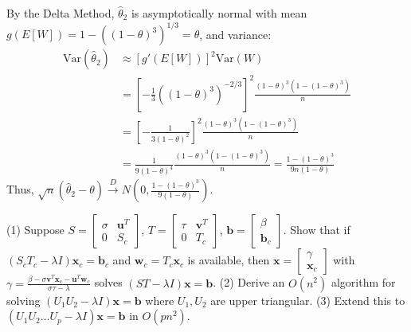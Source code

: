 \begin{solution}
By the Delta Method, $\hat{\theta}_2$ is asymptotically normal with mean $g(E[W]) = 1 - ((1-\theta)^3)^{1/3} = \theta$, and variance:
\begin{align*}
\text{Var}(\hat{\theta}_2) &\approx [g'(E[W])]^2 \text{Var}(W) \\
&= \left[ -\frac{1}{3} ((1-\theta)^3)^{-2/3} \right]^2 \frac{(1-\theta)^3(1-(1-\theta)^3)}{n} \\
&= \left[ -\frac{1}{3(1-\theta)^2} \right]^2 \frac{(1-\theta)^3(1-(1-\theta)^3)}{n} \\
&= \frac{1}{9(1-\theta)^4} \frac{(1-\theta)^3 (1 - (1-\theta)^3)}{n} = \frac{1 - (1-\theta)^3}{9n(1-\theta)}
\end{align*}
Thus, $\sqrt{n}(\hat{\theta}_2 - \theta) \xrightarrow{D} N\left(0, \frac{1 - (1-\theta)^3}{9(1-\theta)}\right)$.
\end{solution}

\begin{exercise}\label{probability:2010:5}
(1) Suppose $S = \begin{bmatrix} \sigma & \mathbf{u}^T \\ 0 & S_c \end{bmatrix}$, $T = \begin{bmatrix} \tau & \mathbf{v}^T \\ 0 & T_c \end{bmatrix}$, $\mathbf{b} = \begin{bmatrix} \beta \\ \mathbf{b}_c \end{bmatrix}$. Show that if $(S_c T_c - \lambda I) \mathbf{x}_c = \mathbf{b}_c$ and $\mathbf{w}_c = T_c \mathbf{x}_c$ is available, then $\mathbf{x} = \begin{bmatrix} \gamma \\ \mathbf{x}_c \end{bmatrix}$ with $\gamma = \frac{\beta - \sigma \mathbf{v}^T \mathbf{x}_c - \mathbf{u}^T \mathbf{w}_c}{\sigma \tau - \lambda}$ solves $(ST - \lambda I) \mathbf{x} = \mathbf{b}$.
(2) Derive an $O(n^2)$ algorithm for solving $(U_1 U_2 - \lambda I) \mathbf{x} = \mathbf{b}$ where $U_1, U_2$ are upper triangular.
(3) Extend this to $(U_1 U_2 \dots U_p - \lambda I) \mathbf{x} = \mathbf{b}$ in $O(p n^2)$.
\end{exercise}

